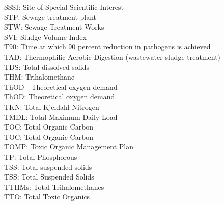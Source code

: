 SSSI:  Site of Special Scientific Interest
\vspace{0.3cm}\\
STP:  Sewage treatment plant
\vspace{0.3cm}\\
STW:  Sewage Treatment Works
\vspace{0.3cm}\\
SVI:  Sludge Volume Index
\vspace{0.3cm}\\
T90:  Time at which 90 percent reduction in pathogens is achieved
\vspace{0.3cm}\\
TAD:  Thermophilic Aerobic Digestion (wastewater sludge treatment)
\vspace{0.3cm}\\
TDS:  Total dissolved solids
\vspace{0.3cm}\\
THM:  Trihalomethane
\vspace{0.3cm}\\
ThOD - Theoretical oxygen demand
\vspace{0.3cm}\\
ThOD:  Theoretical oxygen demand
\vspace{0.3cm}\\
TKN: Total Kjeldahl Nitrogen
\vspace{0.3cm}\\
TMDL:  Total Maximum Daily Load
\vspace{0.3cm}\\
TOC:  Total Organic Carbon
\vspace{0.3cm}\\
TOC: Total Organic Carbon
\vspace{0.3cm}\\
TOMP: Toxic Organic Management Plan
\vspace{0.3cm}\\
TP:  Total Phosphorous 
\vspace{0.3cm}\\
TSS:  Total suspended solids 
\vspace{0.3cm}\\
TSS: Total Suspended Solids
\vspace{0.3cm}\\
TTHMs:  Total Trihalomethanes
\vspace{0.3cm}\\
TTO: Total Toxic Organics
\vspace{0.3cm}\\
